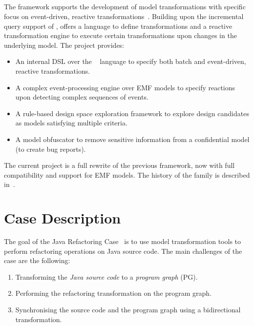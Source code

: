 \documentclass[submission,copyright,creativecommons]{eptcs}
\begin{document}
\subsection{\viatra}

The \viatra framework supports the development of model transformations with specific focus on event-driven, reactive transformations~\cite{viatra}. Building upon the incremental query support of \eiq, \viatra offers a language to define transformations and a reactive transformation engine to execute certain transformations upon changes in the underlying model. The \viatra project provides:

\begin{itemize}[noitemsep]
	\item An internal DSL over the \xtend~\cite{Xtend} language to specify both batch and event-driven, reactive transformations.
	\item A complex event-processing engine over EMF models to specify reactions upon detecting complex sequences of events.
	\item A rule-based design space exploration framework to explore design candidates as models satisfying multiple criteria.
	\item A model obfuscator to remove sensitive information from a confidential model (\eg to create bug reports).
\end{itemize}

The current \viatra{} project is a full rewrite of the previous \viatratwo{} framework, now with full compatibility and support for EMF models. The history of the \viatra{} family is described in~\cite{viatra-history}.

\section{Case Description}

The goal of the Java Refactoring Case~\cite{ttc-refactoring-case} is to use model transformation tools to perform refactoring operations on Java source code. The main challenges of the case are the following:

\begin{enumerate}[noitemsep]
\item Transforming the \emph{Java source code} to a \emph{program graph} (PG).
\item Performing the refactoring transformation on the program graph.
\item Synchronising the source code and the program graph using a bidirectional transformation.
\end{enumerate}
\end{document}
